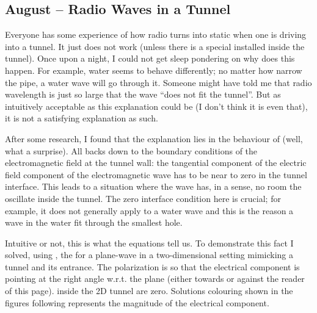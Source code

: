 \documentclass{article}
\begin{document}
\subsection{August – Radio Waves in a Tunnel}


Everyone has some experience of how radio turns into static when one is driving into a tunnel. It just does not work (unless there is a special   installed inside the tunnel).
Once upon a night, I could not get sleep pondering on why does this happen. For example, water seems to behave differently; no matter how narrow the pipe, a water wave will go through it. Someone might have told me that  radio wavelength is just so large that the wave “does not fit the tunnel”. But as intuitively acceptable as this explanation could be (I don't think it is even that), it is not a satisfying explanation as such.


After some research, I found that the explanation lies in the behaviour of  (well, what a surprise). All backs down to the boundary conditions of the electromagnetic field at the tunnel wall: the tangential component of the electric field component of the electromagnetic wave has to be near to zero in the tunnel interface. This leads to a situation where the wave has, in a sense, no room the oscillate inside the tunnel. The zero interface condition here is crucial; for example, it does not generally apply to a water wave and this is the reason a wave in the water fit through the smallest hole.


Intuitive or not, this is what the equations tell us. To demonstrate this fact I solved, using , the  for a plane-wave in a two-dimensional setting mimicking a tunnel and its entrance. The  polarization is so that the electrical component is pointing at the right angle w.r.t. the plane (either towards or against the reader of this page).  inside the 2D tunnel are zero. Solutions colouring shown in the figures following represents the magnitude of the electrical component.
\end{document}
